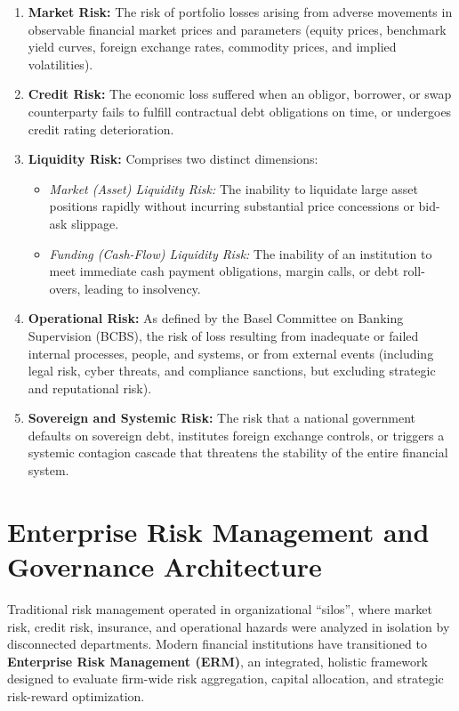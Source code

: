 \begin{enumerate}[leftmargin=1.5em, itemsep=4pt]
    \item \textbf{Market Risk:} The risk of portfolio losses arising from adverse movements in observable financial market prices and parameters (equity prices, benchmark yield curves, foreign exchange rates, commodity prices, and implied volatilities).
    \item \textbf{Credit Risk:} The economic loss suffered when an obligor, borrower, or swap counterparty fails to fulfill contractual debt obligations on time, or undergoes credit rating deterioration.
    \item \textbf{Liquidity Risk:} Comprises two distinct dimensions:
    \begin{itemize}
        \item \textit{Market (Asset) Liquidity Risk:} The inability to liquidate large asset positions rapidly without incurring substantial price concessions or bid-ask slippage.
        \item \textit{Funding (Cash-Flow) Liquidity Risk:} The inability of an institution to meet immediate cash payment obligations, margin calls, or debt roll-overs, leading to insolvency.
    \end{itemize}
    \item \textbf{Operational Risk:} As defined by the Basel Committee on Banking Supervision (BCBS), the risk of loss resulting from inadequate or failed internal processes, people, and systems, or from external events (including legal risk, cyber threats, and compliance sanctions, but excluding strategic and reputational risk).
    \item \textbf{Sovereign and Systemic Risk:} The risk that a national government defaults on sovereign debt, institutes foreign exchange controls, or triggers a systemic contagion cascade that threatens the stability of the entire financial system.
\end{enumerate}

\section{Enterprise Risk Management and Governance Architecture}

Traditional risk management operated in organizational ``silos'', where market risk, credit risk, insurance, and operational hazards were analyzed in isolation by disconnected departments. Modern financial institutions have transitioned to \textbf{Enterprise Risk Management (ERM)}, an integrated, holistic framework designed to evaluate firm-wide risk aggregation, capital allocation, and strategic risk-reward optimization.

